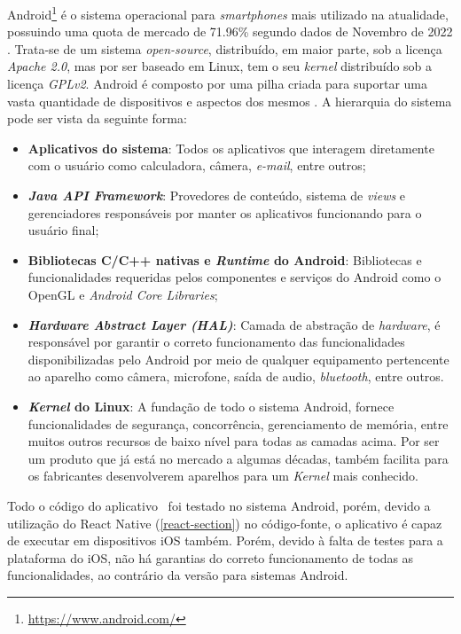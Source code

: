 Android\footnote{\url{https://www.android.com/}} é o sistema operacional para \textit{smartphones} mais utilizado na atualidade, possuindo uma quota de mercado de 71.96\% segundo dados de Novembro de 2022 \cite{mobile-os}. Trata-se de um sistema \textit{open-source}, distribuído, em maior parte, sob a licença \textit{Apache 2.0}, mas por ser baseado em Linux, tem o seu \textit{kernel} distribuído sob a licença \textit{GPLv2}. Android é composto por uma pilha criada para suportar uma vasta quantidade de dispositivos e aspectos dos mesmos \cite{android}. A hierarquia do sistema pode ser vista da seguinte forma:

\begin{itemize}
    \item \textbf{Aplicativos do sistema}: Todos os aplicativos que interagem diretamente com o usuário como calculadora, câmera, \textit{e-mail}, entre outros;
    \item \textbf{\textit{Java API Framework}}: Provedores de conteúdo, sistema de \textit{views} e gerenciadores responsáveis por manter os aplicativos funcionando para o usuário final;
    \item \textbf{Bibliotecas C/C++ nativas e \textit{Runtime} do Android}: Bibliotecas e funcionalidades requeridas pelos componentes e serviços do Android como o OpenGL e \textit{Android Core Libraries};
    \item \textbf{\textit{Hardware Abstract Layer (HAL)}}: Camada de abstração de \textit{hardware}, é responsável por garantir o correto funcionamento das funcionalidades disponibilizadas pelo Android por meio de qualquer equipamento pertencente ao aparelho como câmera, microfone, saída de audio, \textit{bluetooth}, entre outros.
    \item \textbf{\textit{Kernel} do Linux}: A fundação de todo o sistema Android, fornece funcionalidades de segurança, concorrência, gerenciamento de memória, entre muitos outros recursos de baixo nível para todas as camadas acima. Por ser um produto que já está no mercado a algumas décadas, também facilita para os fabricantes desenvolverem aparelhos para um \textit{Kernel} mais conhecido.
\end{itemize}

Todo o código do aplicativo \appName\ foi testado no sistema Android, porém, devido a utilização do React Native (\ref{react-section}) no código-fonte, o aplicativo é capaz de executar em dispositivos iOS também. Porém, devido à falta de testes para a plataforma do iOS, não há garantias do correto funcionamento de todas as funcionalidades, ao contrário da versão para sistemas Android.

